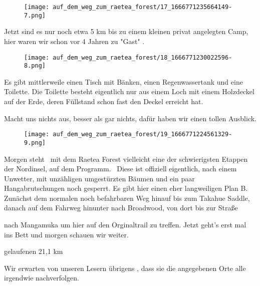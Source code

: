 \begin{figure}[H]
	\centering
	\texttt{[image: auf\_dem\_weg\_zum\_raetea\_forest/17\_1666771235664149-7.png]}
	\caption{}
	\label{fig:17_1666771235664149-7}
\end{figure}

  Jetzt sind es nur noch etwa 5 km bis zu einem kleinen privat angelegten Camp, hier waren wir schon vor 4 Jahren zu "Gast" .
 


\begin{figure}[H]
	\centering
	\texttt{[image: auf\_dem\_weg\_zum\_raetea\_forest/18\_1666771230022596-8.png]}
	\caption{}
	\label{fig:18_1666771230022596-8}
\end{figure}

  Es gibt mittlerweile einen Tisch mit Bänken, einen Regenwassertank und eine Toilette. Die Toilette besteht eigentlich nur aus einem Loch mit einem Holzdeckel auf der Erde, deren Füllstand schon fast den Deckel erreicht hat.
 


  Macht uns nichts aus, besser als gar nichts, dafür haben wir einen tollen Ausblick.
 


\begin{figure}[H]
	\centering
	\texttt{[image: auf\_dem\_weg\_zum\_raetea\_forest/19\_1666771224561329-9.png]}
	\caption{}
	\label{fig:19_1666771224561329-9}
\end{figure}

  Morgen steht  mit dem Raetea Forest vielleicht eine der schwierigsten Etappen der Nordinsel, auf dem Programm.  Diese ist offiziell eigentlich, nach einem Unwetter, mit unzähligen umgestürzten Bäumen und ein paar Hangabrutschungen noch gesperrt. Es gibt hier einen eher langweiligen Plan B. Zunächst dem normalen noch befahrbaren Weg hinauf bis zum Takahue Saddle, danach auf dem Fahrweg hinunter nach Broadwood, von dort bis zur Straße
 


  nach Mangamuka um hier auf den Orginaltrail zu treffen. Jetzt geht's erst mal ins Bett und morgen schauen wir weiter.
 


  gelaufenen 21,1 km
 


  Wir erwarten von unseren Lesern übrigens , dass sie die angegebenen Orte alle irgendwie nachverfolgen. 
 

